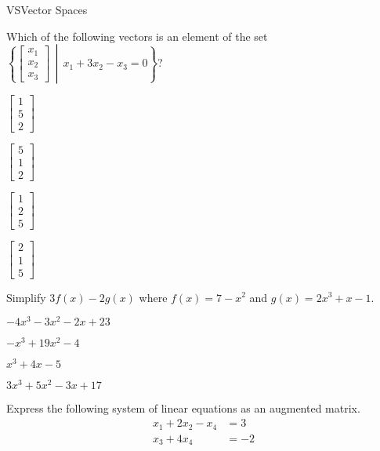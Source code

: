 \documentclass{article}
\newcommand{\setBuilder}[2]{\left\{#1\,\middle|\,#2\right\}}
\begin{document}
\begin{module}{VS}{Vector Spaces}
\begin{readinessAssuranceTest}
\item Which of the following vectors is an element of the set
		\(\setBuilder{\begin{bmatrix} x_1 \\ x_2 \\ x_3 \end{bmatrix}}{ x_1+3x_2-x_3=0}\)?

\begin{multicols}{4}
\begin{readinessAssuranceTestChoices}
\item \(\begin{bmatrix} 1 \\ 5 \\ 2 \end{bmatrix}\) 
\item \(\begin{bmatrix} 5 \\ 1 \\ 2 \end{bmatrix}\) 
\item \(\begin{bmatrix} 1 \\ 2 \\ 5 \end{bmatrix}\) 
\item \(\begin{bmatrix} 2 \\ 1 \\ 5 \end{bmatrix}\) %

\end{readinessAssuranceTestChoices}
\end{multicols}

\item Simplify \(3f(x)-2g(x)\) where
      \(f(x)=7-x^2\) and
      \(g(x)=2x^3+x-1\).

\begin{multicols}{4}
\begin{readinessAssuranceTestChoices}
\item \(-4x^3-3x^2-2x+23\) %
\item \(-x^3+19x^2-4\)
\item \(x^3+4x-5\)
\item \(3x^3+5x^2-3x+17\)
\end{readinessAssuranceTestChoices}
\end{multicols}


\item Express the following system of linear equations as an augmented matrix.
\begin{align*}
  x_1 + 2x_2      -  x_4 &= 3 \\
             x_3 + 4x_4 &= -2
\end{align*}


\end{readinessAssuranceTest}
\end{module}
\end{document}
